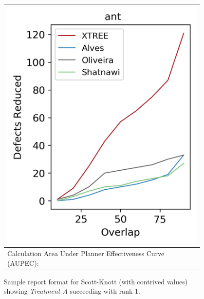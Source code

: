 \begin{figure}[b!]
\small
\centering
\begin{tabular}{|p{0.95\linewidth}|} \hline
\begin{center}
    \includegraphics[width=0.6\linewidth]{images/sample_graph.png}
\end{center}
\\\hline
Calculation Area Under Planner Effectiveness Curve (AUPEC):
\\\hline
\end{tabular}
\caption{Sample report format for Scott-Knott (with contrived values) showing \textit{Treatment A} succeeding with rank 1.}
\label{fig:report_sample}
\end{figure}
